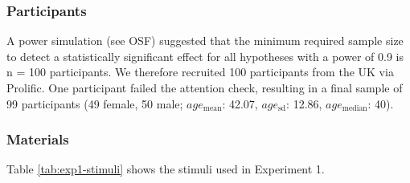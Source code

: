\documentclass[
  doc,floatsintext]{apa6}
\begin{document}
\subsubsection{Participants}\label{participants}

A power simulation (see OSF) suggested that the minimum required sample size to detect a statistically significant effect for all hypotheses with a power of 0.9 is n = 100 participants. We therefore recruited 100 participants from the UK via Prolific. One participant failed the attention check, resulting in a final sample of 99 participants (49 female, 50 male; \(age_\text{mean}\): 42.07, \(age_\text{sd}\): 12.86, \(age_\text{median}\): 40).

\subsubsection{Materials}\label{materials}

Table \ref{tab:exp1-stimuli} shows the stimuli used in Experiment 1.

\begingroup\fontsize{8}{10}\selectfont
\end{document}
